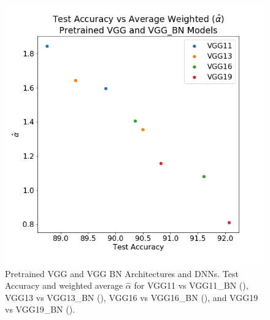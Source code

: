 \begin{figure}[!htb]
 \centering
   \includegraphics[scale=0.40]{img/vgg-w_alphas.png}
   \caption{
Pretrained VGG and VGG BN Architectures and DNNs.  Test Accuracy and weighted average $\hat{\alpha}$ for
 VGG11 vs VGG11\_BN ({\color{blue}{blue}}),
VGG13 vs VGG13\_BN ({\color{orange}{orange}}),
VGG16 vs VGG16\_BN ({\color{green}{green}}),  and
VGG19 vs VGG19\_BN ({\color{red}{red}}). 
}
  \label{fig:vgg}
\end{figure}



